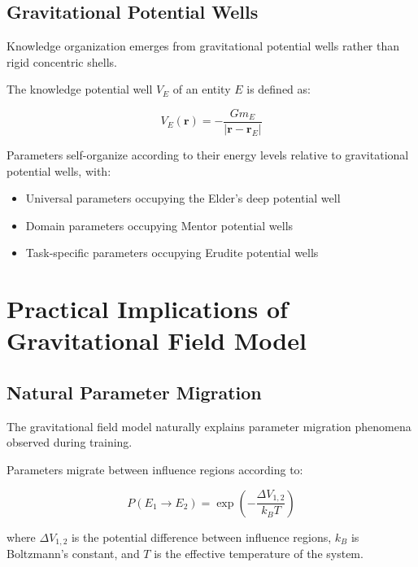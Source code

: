\subsection{Gravitational Potential Wells}

Knowledge organization emerges from gravitational potential wells rather than rigid concentric shells.

\begin{definition}
The knowledge potential well $V_E$ of an entity $E$ is defined as:

\begin{equation}
V_E(\mathbf{r}) = -\frac{G m_E}{|\mathbf{r} - \mathbf{r}_E|}
\end{equation}
\end{definition}

\begin{theorem}
Parameters self-organize according to their energy levels relative to gravitational potential wells, with:
\begin{itemize}
    \item Universal parameters occupying the Elder's deep potential well
    \item Domain parameters occupying Mentor potential wells
    \item Task-specific parameters occupying Erudite potential wells
\end{itemize}
\end{theorem}

\section{Practical Implications of Gravitational Field Model}

\subsection{Natural Parameter Migration}

The gravitational field model naturally explains parameter migration phenomena observed during training.

\begin{theorem}
Parameters migrate between influence regions according to:

\begin{equation}
P(E_1 \rightarrow E_2) = \exp\left(-\frac{\Delta V_{1,2}}{k_B T}\right)
\end{equation}

where $\Delta V_{1,2}$ is the potential difference between influence regions, $k_B$ is Boltzmann's constant, and $T$ is the effective temperature of the system.
\end{theorem}

